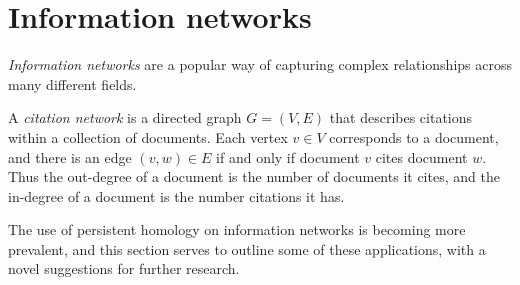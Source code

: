 \section{Information networks}

\emph{Information networks} are a popular way of capturing complex relationships across many different fields.

\begin{example}
    A \emph{citation network} is a directed graph $G = (V,E)$ that describes citations within a collection of documents. Each vertex $v \in V$ corresponds to a document, and there is an edge $(v, w) \in E$ if and only if document $v$ cites document $w$. Thus the out-degree of a document is the number of documents it cites, and the in-degree of a document is the number citations it has.
\end{example}

The use of persistent homology on information networks is becoming more prevalent, and this section serves to outline some of these applications, with a novel suggestions for further research.


